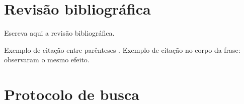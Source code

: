 \documentclass[12pt,a4paper]{article}
\begin{document}
\section{Revisão bibliográfica}
%
%
%
%
%

Escreva aqui a revisão bibliográfica.

Exemplo de citação entre parênteses \cite{silva2024exemplo}. Exemplo de citação
no corpo da frase:  observaram o mesmo efeito.



\appendix

\section{Protocolo de busca}
\end{document}
